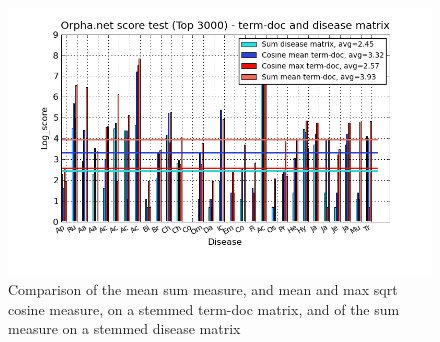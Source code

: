 \begin{figure}[H]
  \caption{Comparison of the mean sum measure, and mean and max sqrt cosine measure, on a stemmed term-doc matrix, and of the sum measure on a stemmed disease matrix}
  \begin{center}
    \includegraphics[width=1.2\textwidth]{barcharts/termDoc_orphan_hist_3000_sum_dm_mea_cos_sqrt_td_max_cos_sqrt_td_mea_sum_nn_td.png}
  \end{center}
  \label{termDoc_orphan_hist_3000_sum_dm_mea_cos_sqrt_td_max_cos_sqrt_td_mea_sum_nn_td}
\end{figure}

